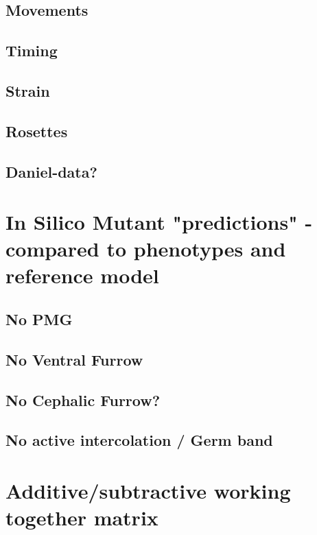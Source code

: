 \subsection{Movements}
\subsection{Timing}
\subsection{Strain}
\subsection{Rosettes}
\subsection{Daniel-data?}
\newpage
\section{In Silico Mutant "predictions" - compared to phenotypes and reference model}
\subsection{No PMG}
\subsection{No Ventral Furrow}
\subsection{No Cephalic Furrow?}
\subsection{No active intercolation / Germ band}
\section{Additive/subtractive working together matrix}
